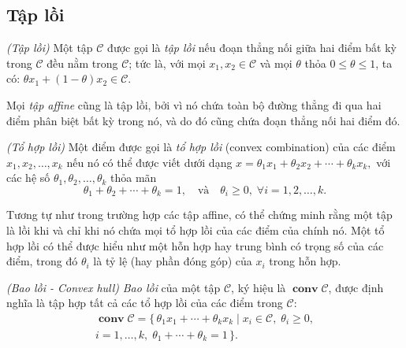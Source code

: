 \subsection{Tập lồi}
\begin{define}\textit{(Tập lồi)}
    \label{define:convex_set}
    Một tập \( \mathcal{C} \) được gọi là \textit{tập lồi} nếu đoạn thẳng nối giữa hai điểm bất kỳ trong \( \mathcal{C} \) đều nằm trong \( \mathcal{C} \); tức là, với mọi \( x_1, x_2 \in \mathcal{C} \) và mọi \( \theta \) thỏa \( 0 \leq \theta \leq 1 \), ta có: \( \theta x_1 + (1 - \theta)x_2 \in \mathcal{C}\).
\end{define}

Mọi \textit{tập affine} cũng là tập lồi, bởi vì nó chứa toàn bộ đường thẳng đi qua hai điểm phân biệt bất kỳ trong nó, và do đó cũng chứa đoạn thẳng nối hai điểm đó.

\begin{define}\textit{(Tổ hợp lồi)}
    \label{define:convex_combination}
    Một điểm được gọi là \textit{tổ hợp lồi} (convex combination) của các điểm \( x_1, x_2, \ldots, x_k \) nếu nó có thể được viết dưới dạng
    \(
    x = \theta_1 x_1 + \theta_2 x_2 + \cdots + \theta_k x_k,
    \)
    với các hệ số \( \theta_1, \theta_2, \ldots, \theta_k \) thỏa mãn
    \[
    \theta_1 + \theta_2 + \cdots + \theta_k = 1, \quad \text{và} \quad \theta_i \geq 0, \; \forall i = 1, 2, \ldots, k.
    \]
\end{define}


Tương tự như trong trường hợp các tập affine, có thể chứng minh rằng một tập là lồi khi và chỉ khi nó chứa mọi tổ hợp lồi của các điểm của chính nó.
Một tổ hợp lồi có thể được hiểu như một hỗn hợp hay trung bình có trọng số
của các điểm, trong đó \( \theta_i \) là tỷ lệ (hay phần đóng góp) của \( x_i \) trong hỗn hợp.

\begin{define}\textit{(Bao lồi - Convex hull)}
    \label{define:convex_hull}
    \textit{Bao lồi} của một tập \( \mathcal{C} \), ký hiệu là \( \operatorname{\textbf{conv}} \mathcal{C} \), được định nghĩa là tập hợp tất cả các tổ hợp lồi của các điểm trong \( \mathcal{C} \):
    \begin{align*}
    \operatorname{\textbf{conv}} \mathcal{C}
    = \{\, \theta_1 x_1 + \cdots + \theta_k x_k
    \mid x_i \in \mathcal{C}, \; \theta_i \ge 0, \\ i = 1, \ldots, k, \;
    \theta_1 + \cdots + \theta_k = 1 \,\}.
    \end{align*}
\end{define}

